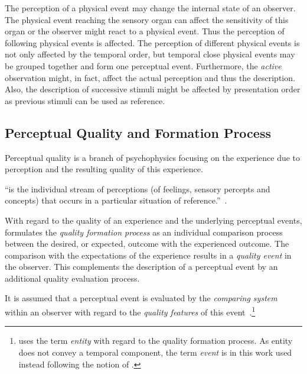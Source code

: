 The perception of a physical event may change the internal state of an observer.
The physical event reaching the sensory organ can affect the sensitivity of this organ or the observer might react to a physical event.
Thus the perception of following physical events is affected.
The perception of different physical events is not only affected by the temporal order, but temporal close physical events may be grouped together and form one perceptual event.
Furthermore, the \emph{active} observation might, in fact, affect the actual perception and thus the description.
Also, the description of successive stimuli might be affected by presentation order as previous stimuli can be used as reference.

\subsection{Perceptual Quality and Formation Process}\label{related:perceivedQuality}
Perceptual quality is a branch of psychophysics focusing on the experience due to perception and the resulting quality of this experience.
\begin{definition}[Experiencing]
``is the individual stream of perceptions (of feelings, sensory percepts and concepts) that occurs in a particular situation of reference.''~\citep[p.~13]{raake_quality_2014}.
\end{definition}

With regard to the quality of an experience and the underlying perceptual events, \citet{jekosch_voice_2005} formulates the \emph{quality formation process} as an individual comparison process between the desired, or expected, outcome with the experienced outcome.
The comparison with the expectations of the experience results in a \emph{quality event} in the observer.
This complements the description of a perceptual event by an additional quality evaluation process.

It is assumed that a perceptual event is evaluated by the \emph{comparing system} within an observer with regard to the \emph{quality features} of this event~\citet[\cf p.~17]{jekosch_voice_2005}.\footnote{\citet{jekosch_voice_2005} uses the term \emph{entity} with regard to the quality formation process.
As entity does not convey a temporal component, the term \emph{event} is in this work used instead following the notion of \citet{blauert_spatial_1996}.}


